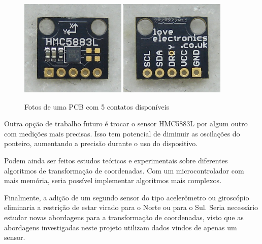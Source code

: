 \documentclass[brazil,pagestart=firstchapter]{abnt}
\begin{document}
\begin{figure}[h]
\centering
\includegraphics[width=0.45\textwidth]{img/sensor_other_pcb_front.jpg}
\includegraphics[width=0.45\textwidth]{img/sensor_other_pcb_back.jpg}
\caption{Fotos de uma PCB com 5 contatos disponíveis}
\label{fig:loveelectronics_photos}
\end{figure}

Outra opção de trabalho futuro é trocar o sensor HMC5883L por algum outro
com medições mais precisas. Isso tem potencial de diminuir as oscilações do
ponteiro, aumentando a precisão durante o uso do dispositivo.

Podem ainda ser feitos estudos teóricos e experimentais sobre diferentes
algoritmos de transformação de coordenadas. Com um microcontrolador com mais
memória, seria possível implementar algoritmos mais complexos.

Finalmente, a adição de um segundo sensor do tipo acelerômetro ou giroscópio
eliminaria a restrição de estar virado para o Norte ou para o Sul. Seria
necessário estudar novas abordagens para a transformação de coordenadas,
visto que as abordagens investigadas neste projeto utilizam dados vindos de
apenas um sensor.






\end{document}
